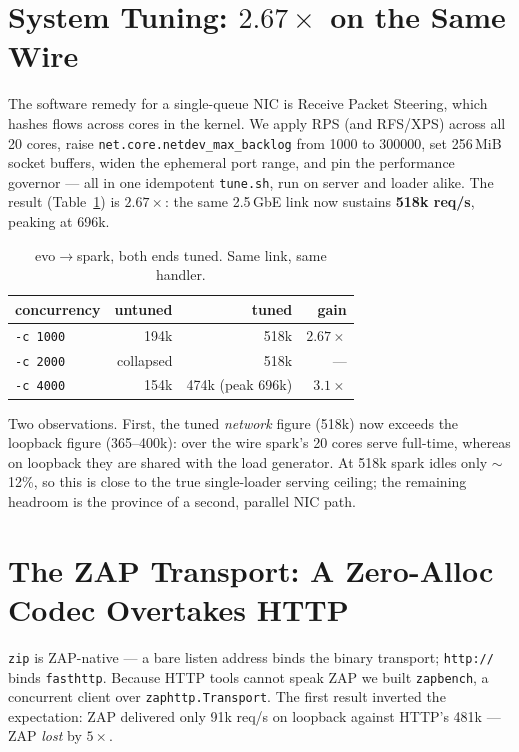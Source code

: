 \documentclass[11pt,twocolumn]{article}
\begin{document}
\section{System Tuning: $2.67\times$ on the Same Wire}
The software remedy for a single-queue NIC is Receive Packet Steering, which
hashes flows across cores in the kernel. We apply RPS (and RFS/XPS) across all 20
cores, raise \texttt{net.core.netdev\_max\_backlog} from 1000 to 300000, set
256\,MiB socket buffers, widen the ephemeral port range, and pin the performance
governor --- all in one idempotent \texttt{tune.sh}, run on server and loader
alike. The result (Table~\ref{tab:tuned}) is $2.67\times$: the same 2.5\,GbE link
now sustains \textbf{518k req/s}, peaking at 696k.

\begin{table}[t]
\centering
\caption{evo$\to$spark, both ends tuned. Same link, same handler.}
\label{tab:tuned}
\begin{tabular}{lrrr}
\toprule
concurrency & untuned & tuned & gain \\
\midrule
\texttt{-c 1000} & 194k & 518k & $2.67\times$ \\
\texttt{-c 2000} & collapsed & 518k & --- \\
\texttt{-c 4000} & 154k & 474k (peak 696k) & $3.1\times$ \\
\bottomrule
\end{tabular}
\end{table}

Two observations. First, the tuned \emph{network} figure (518k) now exceeds the
loopback figure (365--400k): over the wire spark's 20 cores serve full-time,
whereas on loopback they are shared with the load generator. At 518k spark idles
only $\sim$12\%, so this is close to the true single-loader serving ceiling; the
remaining headroom is the province of a second, parallel NIC path.

\section{The ZAP Transport: A Zero-Alloc Codec Overtakes HTTP}
\label{sec:zap}
\texttt{zip} is ZAP-native --- a bare listen address binds the binary transport;
\texttt{http://} binds \texttt{fasthttp}. Because HTTP tools cannot speak ZAP we
built \texttt{zapbench}, a concurrent client over \texttt{zaphttp.Transport}. The
first result inverted the expectation: ZAP delivered only 91k req/s on loopback
against HTTP's 481k --- ZAP \emph{lost} by $5\times$.
\end{document}

